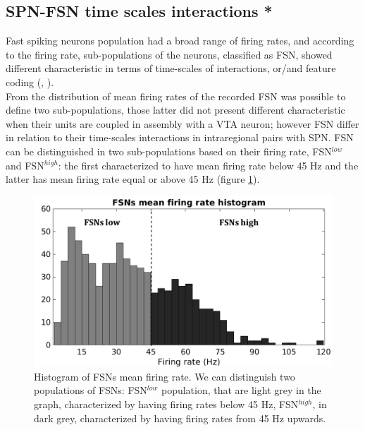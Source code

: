 \subsection{SPN-FSN time scales interactions *}
\label{sec:SPN-FSN_Bin}
Fast spiking neurons population had a broad range of firing rates, and according to the firing rate, sub-populations of the neurons, classified as FSN, showed different characteristic in terms of time-scales of interactions, or/and feature coding (\cite{Heimer1997}, \cite{Tachibana2012}).\\From the distribution of mean firing rates of the recorded FSN was possible to define two sub-populations, those latter did not present different characteristic when their units are coupled in assembly with a VTA neuron; however FSN differ in relation to their time-scales interactions in intraregional pairs with SPN. FSN can be distinguished in two sub-populations based on their firing rate, FSN$^{low}$ and FSN$^{high}$: the first characterized to have mean firing rate below 45 Hz and the latter has mean firing rate equal or above 45 Hz (figure \ref{fig:FSNsFireHisto}).\\
\begin{figure}
    \centering
    \includegraphics[scale=0.6]{figures/FSNFiringRateLightDark.pdf}
    \caption{Histogram of FSNs mean firing rate. We can distinguish two populations of FSNs: FSN$^{low}$ population, that are light grey in the graph, characterized by having firing rates below 45 Hz, FSN$^{high}$, in dark grey, characterized by having firing rates from 45 Hz upwards.}
    \label{fig:FSNsFireHisto}
\end{figure}
